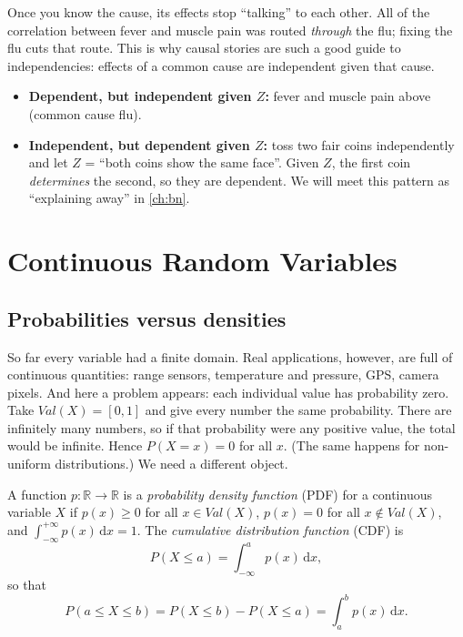 \documentclass[11pt, oneside]{book}
\newcommand{\R}{\mathbb{R}}
\newcommand{\dd}{\,\mathrm{d}}
\newcommand{\Val}{\mathit{Val}}          %
\let\originalsection\section
\renewcommand{\section}{\Needspace{7\baselineskip}\originalsection}
\let\originalsubsection\subsection
\renewcommand{\subsection}{\Needspace{6\baselineskip}\originalsubsection}
\begin{document}
\begin{intbox}[unbreakable]
Once you know the cause, its effects stop ``talking'' to each other. All of
the correlation between fever and muscle pain was routed \emph{through} the
flu; fixing the flu cuts that route. This is why causal stories are such a
good guide to independencies: effects of a common cause are independent given
that cause.
\end{intbox}

\begin{notebox}[title={Independence and conditional independence do not imply each other}]
\begin{itemize}
  \item \textbf{Dependent, but independent given $Z$:} fever and muscle pain
    above (common cause flu).
  \item \textbf{Independent, but dependent given $Z$:} toss two fair coins
    independently and let $Z$ = ``both coins show the same face''. Given $Z$,
    the first coin \emph{determines} the second, so they are dependent. We will
    meet this pattern as ``explaining away'' in \cref{ch:bn}.
\end{itemize}
\end{notebox}

\section{Continuous Random Variables}
\label{sec:continuous}

\subsection{Probabilities versus densities}

So far every variable had a finite domain. Real applications, however, are
full of continuous quantities: range sensors, temperature and pressure, GPS,
camera pixels. And here a problem appears: each individual value has
probability zero. Take $\Val(X) = [0, 1]$ and give every number the same
probability. There are infinitely many numbers, so if that probability were
any positive value, the total would be infinite. Hence $P(X = x) = 0$ for all
$x$. (The same happens for non-uniform distributions.) We need a different
object.

\begin{defbox}[title={Probability density and cumulative distribution}, unbreakable]
A function $p: \R \to \R$ is a \emph{probability density function} (PDF) for a
continuous variable $X$ if $p(x) \geq 0$ for all $x \in \Val(X)$, $p(x) = 0$
for all $x \notin \Val(X)$, and $\int_{-\infty}^{+\infty} p(x) \dd x = 1$.
The \emph{cumulative distribution function} (CDF) is
\[
P(X \leq a) = \int_{-\infty}^{a} p(x) \dd x,
\]
so that
\[
P(a \leq X \leq b) = P(X \leq b) - P(X \leq a) = \int_{a}^{b} p(x) \dd x .
\]
\end{defbox}
\end{document}
